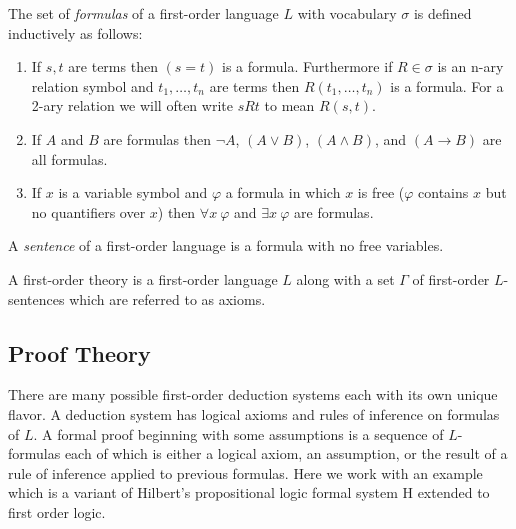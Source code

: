 \documentclass[12pt, leqno]{article}
\newcommand{\uq}[1]{\forall{#1} \:}
\newcommand{\eq}[1]{\exists{#1} \:}
\newenvironment{definition}[1][Definition:]{\begin{trivlist}
\item[\hskip \labelsep {\bfseries #1}]}{\end{trivlist}}
\theoremstyle{theorem}
\theoremstyle{definition}
\theoremstyle{definition}
\theoremstyle{remark}
\theoremstyle{definition}
\theoremstyle{remark}
\begin{document}
\begin{definition}
The set of \textit{formulas} of a first-order language $L$ with vocabulary $\sigma$ is defined inductively as follows:
\begin{enumerate}
\item If $s,t$ are terms then $(s = t)$ is a formula. Furthermore if $R \in \sigma$ is an n-ary relation symbol and $t_1, \dots, t_n$ are terms then $R(t_1, \dots, t_n)$ is a formula. For a 2-ary relation we will often write $s R t$ to mean $R(s, t)$. 
\item If $A$ and $B$ are formulas then $\neg A$, $(A \vee B)$, $(A \wedge B)$, and $(A \to B)$ are all formulas.
\item If $x$ is a variable symbol and $\varphi$ a formula in which $x$ is free ($\varphi$ contains $x$ but no quantifiers over $x$) then $\uq{x} \varphi$ and $\eq{x} \varphi$ are formulas. 
\end{enumerate}
\end{definition}

\begin{definition}
A \textit{sentence} of a first-order language is a formula with no free variables.  
\end{definition}

\begin{definition}
A first-order theory is a first-order language $L$ along with a set $\Gamma$ of first-order $L$-sentences which are referred to as axioms. 
\end{definition}

\subsection{Proof Theory}

There are many possible first-order deduction systems each with its own unique flavor. A deduction system has logical axioms and rules of inference on formulas of $L$. A formal proof beginning with some assumptions is a sequence of $L$-formulas each of which is either a logical axiom, an assumption, or the result of a rule of inference applied to previous formulas. Here we work with an example which is a variant of Hilbert's propositional logic formal system H extended to first order logic.
\end{document}
